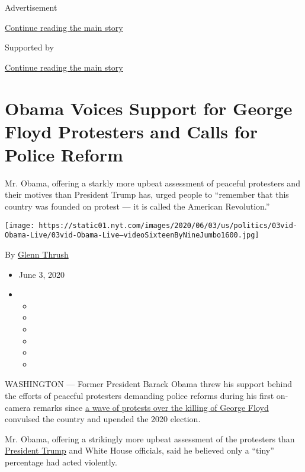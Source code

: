 Advertisement

\protect\hyperlink{after-top}{Continue reading the main story}

Supported by

\protect\hyperlink{after-sponsor}{Continue reading the main story}

\hypertarget{obama-voices-support-for-george-floyd-protesters-and-calls-for-police-reform}{%
\section{Obama Voices Support for George Floyd Protesters and Calls for
Police
Reform}\label{obama-voices-support-for-george-floyd-protesters-and-calls-for-police-reform}}

Mr. Obama, offering a starkly more upbeat assessment of peaceful
protesters and their motives than President Trump has, urged people to
``remember that this country was founded on protest --- it is called the
American Revolution.''

\texttt{[image: https://static01.nyt.com/images/2020/06/03/us/politics/03vid-Obama-Live/03vid-Obama-Live--videoSixteenByNineJumbo1600.jpg]}

By \href{https://www.nytimes.com/by/glenn-thrush}{Glenn Thrush}

\begin{itemize}
\item
  June 3, 2020
\item
  \begin{itemize}
  \item
  \item
  \item
  \item
  \item
  \item
  \end{itemize}
\end{itemize}

WASHINGTON --- Former President Barack Obama threw his support behind
the efforts of peaceful protesters demanding police reforms during his
first on-camera remarks since
\href{https://www.nytimes.com/2020/06/03/us/live-george-floyd-protests-today.html}{a
wave of protests over the killing of George Floyd} convulsed the country
and upended the 2020 election.

Mr. Obama, offering a strikingly more upbeat assessment of the
protesters than
\href{https://www.nytimes.com/interactive/2020/us/elections/donald-trump.html}{President
Trump} and White House officials, said he believed only a ``tiny''
percentage had acted violently.

